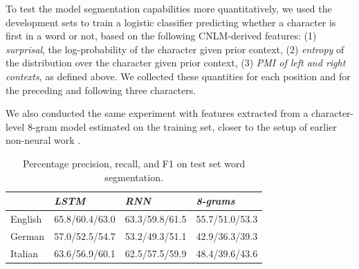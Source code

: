 To test the model segmentation capabilities more quantitatively, we
used the development sets to train a logistic classifier predicting whether a character is first
in a word or not, based on the following CNLM-derived features: (1)
\emph{surprisal}, the log-probability of the character given prior context, (2)
\emph{entropy} of the distribution over the character given prior
context, (3) \emph{PMI of left and right contexts}, as defined above.
We collected these quantities for each position and for the preceding and following three characters.

We also conducted the same experiment with features extracted from a
character-level 8-gram model estimated on the training set, closer to
the setup of earlier non-neural work
\cite{saffran-word-1996, feng-accessor-2004}.


\begin{table}[t]
	\footnotesize
  \begin{center}
    \begin{tabular}{l|l|l|l}
      \multicolumn{1}{c|}{}&\emph{LSTM}&\emph{RNN}&\emph{8-grams}\\
      \hline
      English & 65.8/60.4/63.0 &   63.3/59.8/61.5 & 55.7/51.0/53.3    \\ %
      German &  57.0/52.5/54.7 &  53.2/49.3/51.1 & 42.9/36.3/39.3   \\ %
      Italian &  63.6/56.9/60.1 & 62.5/57.5/59.9  & 48.4/39.6/43.6    \\ %
    \end{tabular}
  \end{center}
  \caption{\label{tab:segmentation-results} Percentage precision, recall, and F1 on test set word segmentation.}
\end{table}

